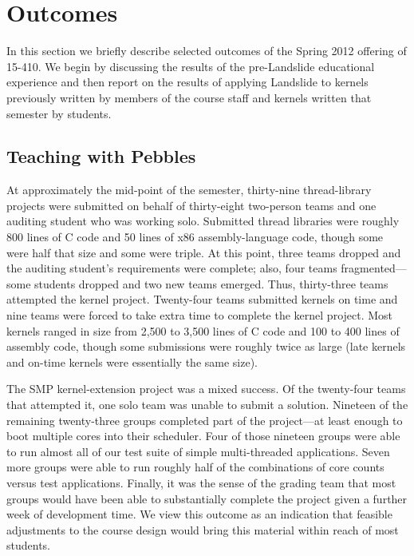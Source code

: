 \section{Outcomes}

In this section we briefly describe selected
outcomes of the Spring 2012 offering of 15-410.
We begin by discussing the results of the
pre-Landslide educational experience and then
report on the results of applying Landslide to
kernels previously written by members of the course staff
and kernels written that semester by students.

\subsection{Teaching with Pebbles}

At approximately the mid-point of the semester,
thirty-nine thread-library projects were submitted
on behalf of thirty-eight two-person teams and one
auditing student who was working solo.
%
Submitted thread libraries were roughly 800 lines of C code
and 50 lines of x86 assembly-language code,
though some were half that size and some were triple.
%
At this point, three teams dropped and the auditing
student's requirements were complete;
also, four teams fragmented---some students dropped and
two new teams emerged.
Thus, thirty-three teams attempted the kernel project.
%
Twenty-four teams submitted kernels on time and nine
teams were forced to take extra time to complete the
kernel project.
Most kernels ranged in size from 2,500 to 3,500 lines
of C code and 100 to 400 lines of assembly code,
though some submissions were roughly twice as large
(late kernels and on-time kernels were essentially the
same size).


The SMP kernel-extension project
was a mixed success.
Of the twenty-four teams that attempted it,
one solo team was unable to submit a solution.
Nineteen of the remaining twenty-three groups
completed part of the project---at least enough to
boot multiple cores
into their scheduler.
Four of those nineteen groups were able to run
almost all of our test suite of simple multi-threaded
applications.
Seven more groups were able to run roughly half of
the combinations of core counts versus test applications.
Finally, it was the sense of the grading team that
most groups would have been able to substantially complete
the project given a further week of development time.
We view this outcome as an indication that feasible adjustments
to the course design would bring this material within reach
of most students.

